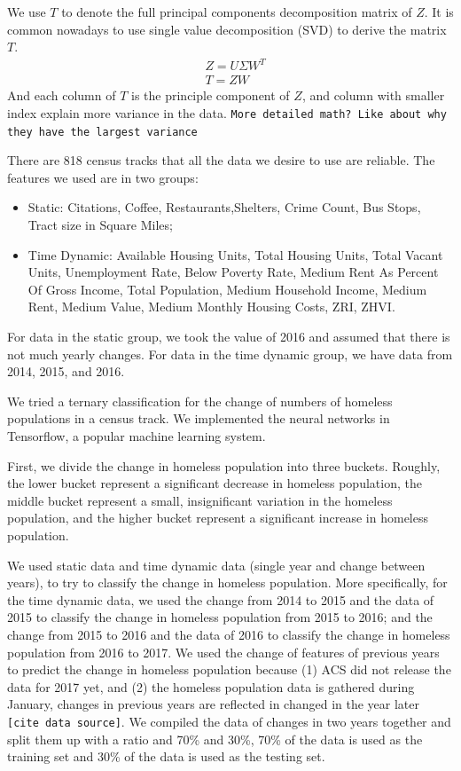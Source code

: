 \documentclass[11pt,letterpaper]{article}
\begin{document}
We use $T$ to denote the full principal components decomposition matrix of $Z$. It is common nowadays to use single value decomposition (SVD) to derive the matrix $T$.
\begin{align}
&Z = U\Sigma W^T\\
&T = ZW
\end{align}
And each column of $T$ is the principle component of $Z$, and column with smaller index explain more variance in the data. \texttt{More detailed math? Like about why they have the largest variance}

There are 818 census tracks that all the data we desire to use are reliable. The features we used are in two groups:
\begin{itemize}
\item Static: Citations, Coffee, Restaurants,Shelters, Crime Count, Bus Stops, Tract size in Square Miles;
\item Time Dynamic: Available Housing Units, Total Housing Units, Total Vacant Units, Unemployment Rate, Below Poverty Rate, Medium Rent As Percent Of Gross Income, Total Population, Medium Household Income, Medium Rent, Medium Value, Medium Monthly Housing Costs, ZRI, ZHVI.
\end{itemize}
For data in the static group, we took the value of 2016 and assumed that there is not much yearly changes. For data in the time dynamic group, we have data from 2014, 2015, and 2016.

We tried a ternary classification for the change of numbers of homeless populations in a census track. We implemented the neural networks in Tensorflow, a popular machine learning system\cite{Tensorflow}.

First, we divide the change in homeless population into three buckets. Roughly, the lower bucket represent a significant decrease in homeless population, the middle bucket represent a small, insignificant variation in the homeless population, and the higher bucket represent a significant increase in homeless population.

We used static data and time dynamic data (single year and change between years), to try to classify the change in homeless population. More specifically, for the time dynamic data, we used the change from 2014 to 2015 and the data of 2015 to classify the change in homeless population from 2015 to 2016; and the change from 2015 to 2016 and the data of 2016 to classify the change in homeless population from 2016 to 2017. We used the change of features of previous years to predict the change in homeless population because (1) ACS did not release the data for 2017 yet, and (2) the homeless population data is gathered during January, changes in previous years are reflected in changed in the year later \texttt{[cite data source]}. We compiled the data of changes in two years together and split them up with a ratio and 70\% and 30\%, 70\% of the data is used as the training set and 30\% of the data is used as the testing set.
\end{document}
